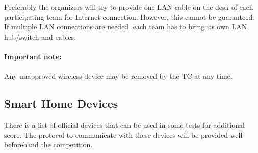 Preferably the organizers will try to provide one LAN cable on the desk of each participating team for Internet connection. However, this cannot be guaranteed. If multiple LAN connections are needed, each team has to bring its own LAN hub/switch and cables.

\paragraph*{Important note:} Any unapproved wireless device may be removed by the TC at any time.

\subsection{Smart Home Devices}\label{rule:smarthomedevices}

There is a list of official devices that can be used in some tests for additional score. The protocol to communicate with these devices will be provided well beforehand the competition.

